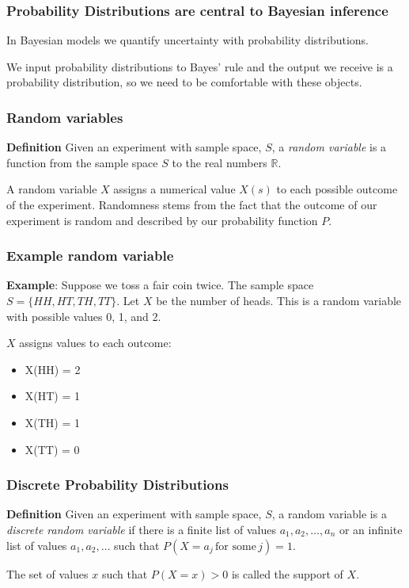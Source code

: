 \documentclass{beamer}
\begin{document}
\begin{frame}
\frametitle{Probability Distributions are central to Bayesian inference}

In Bayesian models we quantify uncertainty with probability distributions. 

\bigskip

We input probability distributions to Bayes' rule and the output we receive is a probability distribution, so we need to be comfortable with these objects.

\end{frame}


\begin{frame}
\frametitle{Random variables}

\textbf{Definition} Given an experiment with sample space, $S$, a \emph{random variable} is a function from the sample space $S$ to the real numbers $\mathbb{R}$.

\bigskip

A random variable $X$ assigns a numerical value $X(s)$ to each possible outcome of the experiment. Randomness stems from the fact that the outcome of our experiment is random and described by our probability function $P$.

\end{frame}


\begin{frame}
\frametitle{Example random variable}

\textbf{Example}: Suppose we toss a fair coin twice. The sample space $S = \{HH, HT, TH, TT\}$. Let $X$ be the number of heads. This is a random variable with possible values 0, 1, and 2. 

\bigskip

$X$ assigns values to each outcome: 
\begin{itemize}
\item X(HH) = 2 
\item X(HT) = 1 
\item X(TH) = 1 
\item X(TT) = 0
\end{itemize}

\end{frame}


\begin{frame}
\frametitle{Discrete Probability Distributions}

\textbf{Definition} Given an experiment with sample space, $S$, a random variable is a \emph{discrete random variable} if there is a finite list of values $a_1, a_2, \ldots, a_n$ or an infinite list of values $a_1, a_2, \ldots$ such that $P(X = a_j \,\textrm{for some} \, j) = 1$. 

\bigskip

The set of values $x$ such that $P(X = x) > 0$ is called the support of $X$.

\end{frame}
\end{document}
